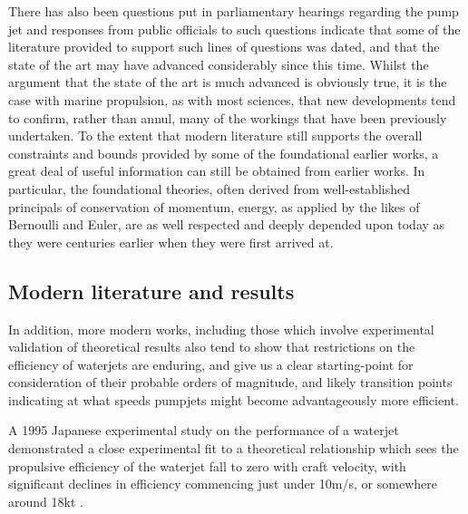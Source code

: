 \documentclass{article}\usepackage[]{graphicx}\usepackage[]{color}
\begin{document}
There has also been questions put in parliamentary hearings regarding the pump jet \parencite{patrick2017} and responses from public officials to such questions indicate that some of the literature provided to support such lines of questions was dated, and that the state of the art may have advanced considerably since this time.  Whilst the argument that the state of the art is much advanced is obviously true, it is the case with marine propulsion, as with most sciences, that new developments tend to confirm, rather than annul, many of the workings that have been previously undertaken.  To the extent that modern literature still supports the overall constraints and bounds provided by some of the foundational earlier works, a great deal of useful information can still be obtained from earlier works.  In particular, the foundational theories, often derived from well-established principals of conservation of momentum, energy, as applied by the likes of Bernoulli and Euler, are as well respected and deeply depended upon today as they were centuries earlier when they were first arrived at.

\subsection{Modern literature and results}
In addition, more modern works, including those which involve experimental validation of theoretical results also tend to show that restrictions on the efficiency of waterjets are enduring, and give us a clear starting-point for consideration of their probable orders of magnitude, and likely transition points indicating at what speeds pumpjets might become advantageously more efficient.

A 1995 Japanese experimental study on the performance of a waterjet demonstrated a close experimental fit to a theoretical relationship which sees the propulsive efficiency of the waterjet fall to zero with craft velocity, with significant declines in efficiency commencing just under 10m/s, or somewhere around 18kt \parencite{fujisawa1995}.
\end{document}

